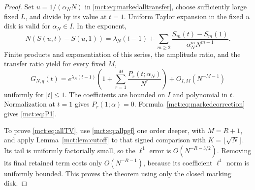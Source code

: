 \documentclass[11pt]{article}
\theoremstyle{definition}
\begin{document}
\begin{proof}
Set $u=1/(\alpha_NN)$ in \eqref{mct:eq:markedalltransfer}, choose sufficiently large fixed $L$, and divide by its value at $t=1$. Uniform Taylor expansion in the fixed $u$ disk is valid for $\alpha_N\in I$. In the exponent,
\[
 N(S(u,t)-S(u,1))=\lambda_N(t-1)
 +\sum_{m\ge2}\frac{S_m(t)-S_m(1)}{\alpha_N^mN^{m-1}}.
\]
Finite products and exponentiation of this series, the amplitude ratio, and the transfer ratio yield for every fixed $M$,
\begin{equation}\label{mct:eq:allpgf}
 G_{N,q}(t)=e^{\lambda_N(t-1)}
 \left(1+\sum_{r=1}^M\frac{P_r(t;\alpha_N)}{N^r}\right)
 +O_{I,M}(N^{-M-1})
\end{equation}
uniformly for $|t|\le1$. The coefficients are bounded on $I$ and polynomial in $t$. Normalization at $t=1$ gives $P_r(1;\alpha)=0$. Formula~\eqref{mct:eq:markedcorrection} gives \eqref{mct:eq:P1}.

To prove \eqref{mct:eq:allTV}, use \eqref{mct:eq:allpgf} one order deeper, with $M=R+1$, and apply Lemma~\ref{mct:lem:cutoff} to that signed comparison with $K=\lfloor\sqrt N\rfloor$. Its tail is uniformly factorially small, so the $\ell^1$ error is $O(N^{-R-3/2})$. Removing its final retained term costs only $O(N^{-R-1})$, because its coefficient $\ell^1$ norm is uniformly bounded. This proves the theorem using only the closed marking disk.
\end{proof}
\end{document}
